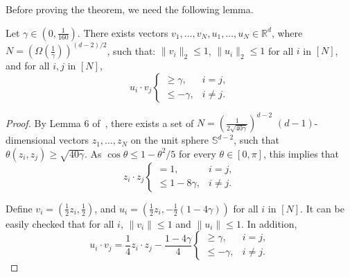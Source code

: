 Before proving the theorem, we need the following lemma.
\begin{lemma}
\label{lem:embed_d_gamma}
Let $\gamma \in (0,\frac 1 {160})$.
There exists vectors $v_1, \ldots, v_N, u_1, \ldots, u_N\in \mathbb{R}^d$, where $N = (\Omega(\frac{1}{\gamma}))^{(d-2)/2}$, such that:
$\| v_i \|_2 \leq 1$, $\| u_i \|_2 \leq 1$ for all $i$ in $[N]$, and for all $i, j$ in $[N]$,
\[ u_i \cdot v_j \begin{cases} \geq \gamma ,& i = j, \\ \leq -\gamma ,& i \neq j. \end{cases} \]
\end{lemma}
\begin{proof}
By Lemma 6 of~\cite{Long-1995}, there exists a set of $N =
(\frac{1}{2\sqrt{40\gamma}})^{d-2}$ $(d-1)$-dimensional vectors $z_1, \ldots,
z_N$ on the unit sphere $\mathbb{S}^{d-2}$, such that $\theta(z_i, z_j) \geq
\sqrt{40 \gamma}$. As $\cos\theta \leq 1-\theta^2/5$ for every $\theta \in
[0,\pi]$, this implies that
\[ z_i \cdot z_j \begin{cases} = 1 ,& i = j, \\ \leq 1- 8\gamma ,& i \neq j. \end{cases} \]

Define $v_i = (\frac12 z_i, \frac12)$, and $u_i = (\frac 12 z_i, -\frac
12(1-4\gamma))$ for all $i$ in $[N]$. It can be easily checked that for all $i$,
$\|v_i\| \leq 1$ and $\|u_i\| \leq 1$. In addition,
$$
u_i \cdot v_j
= \frac 1 4 z_i \cdot z_j - \frac {1-4\gamma} 4 \begin{cases} \geq \gamma ,& i = j, \\ \leq -\gamma ,& i \neq j. \end{cases}
$$
\end{proof}

